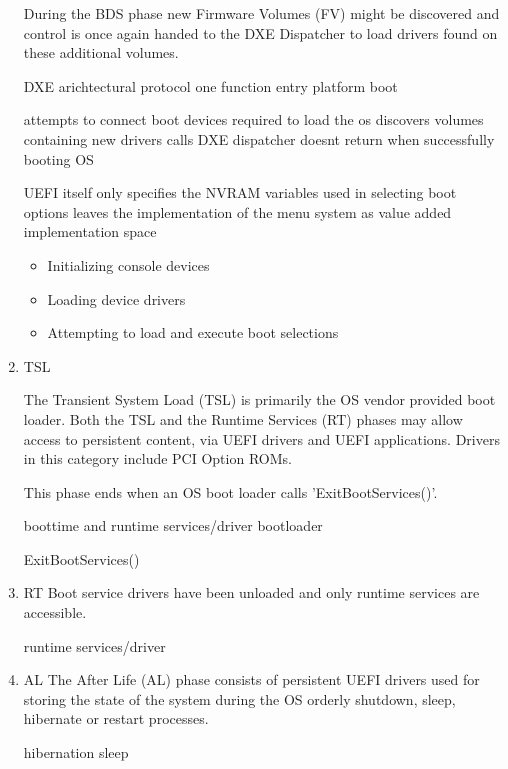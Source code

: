 \begin{enumerate}

    During the BDS phase new Firmware Volumes (FV) might be discovered and control is once again handed to the DXE Dispatcher to load drivers found on these additional volumes.


    DXE arichtectural protocol
    one function entry
    platform boot

    attempts to connect boot devices required to load the os
    discovers volumes containing new drivers
    calls DXE dispatcher
    doesnt return when successfully booting OS

    UEFI itself only specifies the NVRAM variables used in selecting boot options
    leaves the implementation of the menu system as value added implementation space\cite{uefi-spec}

    \cite{pi-spec}

    \begin{itemize}
        \item Initializing console devices
        \item Loading device drivers
        \item Attempting to load and execute boot selections
    \end{itemize}

    \item{\acf{TSL}}

    The Transient System Load (TSL) is primarily the OS vendor provided boot loader. Both the TSL and the Runtime Services (RT) phases may allow access to persistent content, via UEFI drivers and UEFI applications. Drivers in this category include PCI Option ROMs.

    This phase ends when an OS boot loader calls 'ExitBootServices()'.

    boottime and runtime services/driver
    bootloader
    \cite[13.3 System Partition]{uefi-spec}
    \cite[3.5.1.1]{uefi-spec}

    ExitBootServices()

    \item{\acf{RT}}
    Boot service drivers have been unloaded and only runtime services are accessible.


    runtime services/driver

    \item{\acf{AL}}
    The After Life (AL) phase consists of persistent UEFI drivers used for storing the state of the system during the OS orderly shutdown, sleep, hibernate or restart processes.

    hibernation
    sleep

\end{enumerate}

